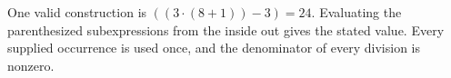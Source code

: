 One valid construction is $\boxed{((3\cdot (8+1))-3)=24}$. Evaluating the parenthesized subexpressions from the inside out gives the stated value. Every supplied occurrence is used once, and the denominator of every division is nonzero.
